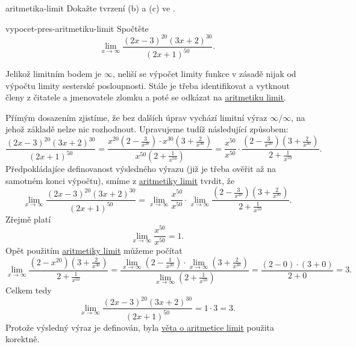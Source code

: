 \begin{exercise}{}{aritmetika-limit}
 Dokažte tvrzení (b) a (c) ve .
\end{exercise}

\begin{problem}{}{vypocet-pres-aritmetiku-limit}
 Spočtěte
 \[
  \lim_{x \to \infty} \frac{(2x - 3)^{20} (3x + 2)^{30}}{(2x + 1)^{50}}.
 \]
\end{problem}
\begin{probsol}
 Jelikož limitním bodem je $\infty$, neliší se výpočet limity funkce v zásadě
 nijak od výpočtu limity sesterské posloupnosti. Stále je třeba identifikovat a
 vytknout  členy z čitatele a jmenovatele zlomku a poté
 se odkázat na \hyperref[thm:aritmetika-limit-funkci]{aritmetiku limit}.

 Přímým dosazením zjistíme, že bez dalších úprav vychází limitní výraz $\infty /
 \infty$, na jehož základě nelze nic rozhodnout. Upravujeme tudíž následující
 způsobem:
 \[
  \frac{(2x-3)^{20}(3x+2)^{30}}{(2x+1)^{50}} = \frac{x^{20}(2 -
  \frac{3}{x^{20}}) \cdot x^{30}(3 + \frac{2}{x^{30}})}{x^{50}(2 +
 	\frac{1}{x^{50}})} = \frac{x^{50}}{x^{50}} \cdot \frac{(2 - \frac{3}{x^{20}})(3
 	+ \frac{2}{x^{30}})}{2 + \frac{1}{x^{50}}}.
 \]
 Předpokládajíce definovanost výsledného výrazu (již je třeba ověřit až na
 samotném konci výpočtu), smíme z
 \hyperref[thm:aritmetika-limit-funkci]{aritmetiky limit} tvrdit, že
 \[
  \lim_{x \to \infty} \frac{(2x-3)^{20}(3x+2)^{30}}{(2x+1)^{50}} = \lim_{x \to
  \infty} \frac{x^{50}}{x^{50}} \cdot \lim_{x \to \infty} \frac{(2 -
  \frac{3}{x^{20}})(3 + \frac{2}{x^{30}})}{2 + \frac{1}{x^{50}}}.
 \]
 Zřejmě platí
 \[
  \lim_{x \to \infty} \frac{x^{50}}{x^{50}} = 1.
 \]
 Opět použitím \hyperref[thm:aritmetika-limit-funkci]{aritmetiky limit} můžeme
 počítat
 \[
  \lim_{x \to \infty} \frac{(2 - x^{20})(3 + \frac{2}{x^{30}})}{2 +
  \frac{1}{x^{50}}} = \frac{\lim_{x \to \infty} (2 - \frac{1}{x^{20}}) \cdot
 	\lim_{x \to \infty} (3 + \frac{2}{x^{30}})}{\lim_{x \to \infty} (2 +
 	\frac{1}{x^{50}})} = \frac{(2 - 0) \cdot (3 + 0)}{2 + 0} = 3.
 \]
 Celkem tedy
 \[
  \lim_{x \to \infty} \frac{(2x-3)^{20}(3x+2)^{30}}{(2x+1)^{50}} = 1 \cdot 3 =
  3.
 \]
 Protože výsledný výraz je definován, byla
 \hyperref[thm:aritmetika-limit-funkci]{věta o aritmetice limit} použita
 korektně.
\end{probsol}

